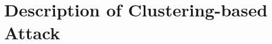 












\section{Description of Clustering-based Attack}
\label{sec:clustering-attack-description}

